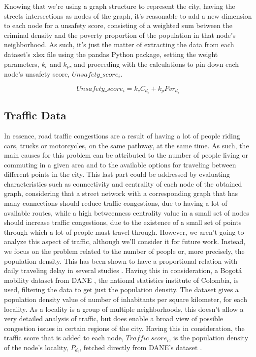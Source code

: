 \documentclass[runningheads]{llncs}
\begin{document}
Knowing that we're using a graph structure to represent the city, having the streets intersections as nodes of the graph, it's reasonable to add a new dimension to each node for a unsafety score, consisting of a weighted sum between the criminal density and the poverty proportion of the population in that node's neighborhood. As such, it's just the matter of extracting the data from each dataset's xlsx file using the pandas Python package, setting the weight parameters, $k_{c}$ and $k_{p}$, and proceeding with the calculations to pin down each node's unsafety score, $Unsafety\_score_i$.

$$Unsafety\_score_i = k_{c} C_{d_i} + k_{p} Pvr_{d_i}$$


\subsection{Traffic Data}

In essence, road traffic congestions are a result of having a lot of people riding cars, trucks or motorcycles, on the same pathway, at the same time. As such, the main causes for this problem can be attributed to the number of people living or commuting in a given area and to the available options for traveling between different points in the city. This last part could be addressed by evaluating characteristics such as connectivity and centrality of each node of the obtained graph, considering that a street network with a corresponding graph that has many connections should reduce traffic congestions, due to having a lot of available routes, while a high betweenness centrality value in a small set of nodes should increase traffic congestions, due to the existence of a small set of points through which a lot of people must travel through. However, we aren't going to analyze this aspect of traffic, although we'll consider it for future work. Instead, we focus on the problem related to the number of people or, more precisely, the population density. This has been shown to have a proportional relation with daily traveling delay in several studies \cite{levinson_network_2012} \cite{louf_how_2014}. Having this in consideration, a Bogotá mobility dataset from DANE \cite{gobierno_de_colombia_dane_nodate}, the national statistics institute of Colombia, is used, filtering the data to get just the population density. The dataset gives a population density value of number of inhabitants per square kilometer, for each locality. As a locality is a group of multiple neighborhoods, this doesn't allow a very detailed analysis of traffic, but does enable a broad view of possible congestion issues in certain regions of the city. Having this in consideration, the traffic score that is added to each node, $Traffic\_score_i$, is the population density of the node's locality, $P_{d_i}$, fetched directly from DANE's dataset \cite{gobierno_de_colombia_dane_nodate}.
\end{document}
